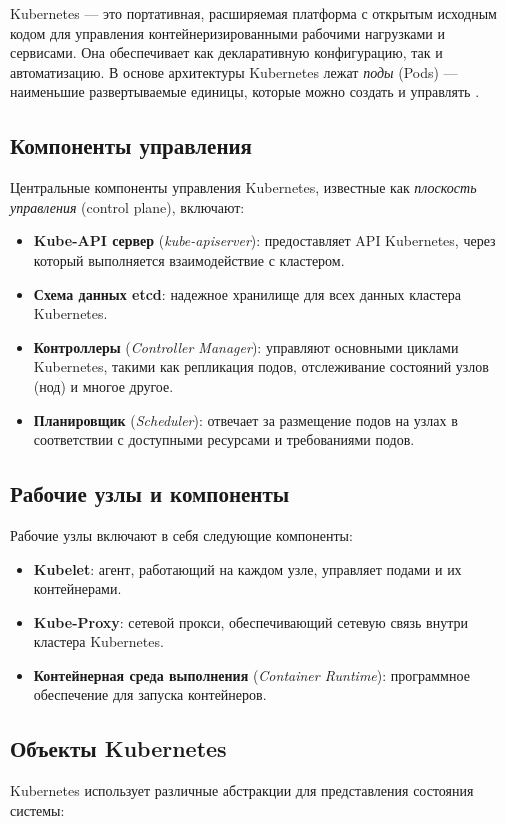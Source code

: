 Kubernetes — это портативная, расширяемая платформа с открытым исходным кодом
для управления контейнеризированными рабочими нагрузками и сервисами. Она
обеспечивает как декларативную конфигурацию, так и автоматизацию. В основе
архитектуры Kubernetes лежат \textit{поды} (Pods)  — наименьшие развертываемые единицы,
которые можно создать и управлять \cite{nocentino2021kubernetes}.

\subsection*{Компоненты управления}
Центральные компоненты управления Kubernetes, известные как \textit{плоскость управления}
(control plane), включают:

\begin{itemize}
   \item \textbf{Kube-API сервер} (\textit{kube-apiserver}): предоставляет API
Kubernetes, через который выполняется взаимодействие с кластером.
   \item \textbf{Схема данных etcd}: надежное хранилище для всех данных
кластера Kubernetes.
   \item \textbf{Контроллеры} (\textit{Controller Manager}): управляют
основными циклами Kubernetes, такими как репликация подов, отслеживание
состояний узлов (нод) и многое другое.
   \item \textbf{Планировщик} (\textit{Scheduler}): отвечает за размещение
подов на узлах в соответствии с доступными ресурсами и требованиями подов.
\end{itemize}

\subsection*{Рабочие узлы и компоненты}
Рабочие узлы включают в себя следующие компоненты:

\begin{itemize}
   \item \textbf{Kubelet}: агент, работающий на каждом узле, управляет подами и
их контейнерами.
   \item \textbf{Kube-Proxy}: сетевой прокси, обеспечивающий сетевую связь
внутри кластера Kubernetes.
   \item \textbf{Контейнерная среда выполнения} (\textit{Container Runtime}):
программное обеспечение для запуска контейнеров.
\end{itemize}

\subsection*{Объекты Kubernetes}
Kubernetes использует различные абстракции для представления состояния системы:

